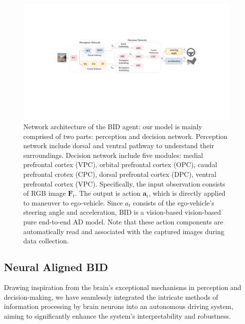 \begin{figure}[t]
	\centering
	\includegraphics[width=\linewidth]{fig/net.pdf}
	\caption{Network architecture of the BID agent:
	our model is mainly comprised of two parts: perception and decision network.
	Perception network include dorsal and ventral pathway to understand their surroundings.
	Decision network include five modules: medial prefrontal cortex (VPC), orbital prefrontal cortex (OPC), caudal prefrontal crotex (CPC), dorsal prefrontal cortex (DPC), ventral prefrontal cortex (VPC).
	Specifically, the input observation consists of RGB image $ \mathbf{F}_{t} $.
	The output is action $\mathbf{a}_{i}$, which is directly applied to maneuver to ego-vehicle.
	Since $a_t$ consists of the ego-vehicle's steering angle and acceleration, BID is a vision-based vision-based pure end-to-end AD model.
	Note that these action components are automatically read and associated with the captured images during data collection.
	}
	\label{fig:fig2}
\end{figure}


\subsection{Neural Aligned BID}
\hspace{1pc}Drawing inspiration from the brain's exceptional mechanisms in perception and decision-making, we have seamlessly integrated the intricate methods of information processing by brain neurons into an autonomous driving system, aiming to significantly enhance the system's interpretability and robustness.

